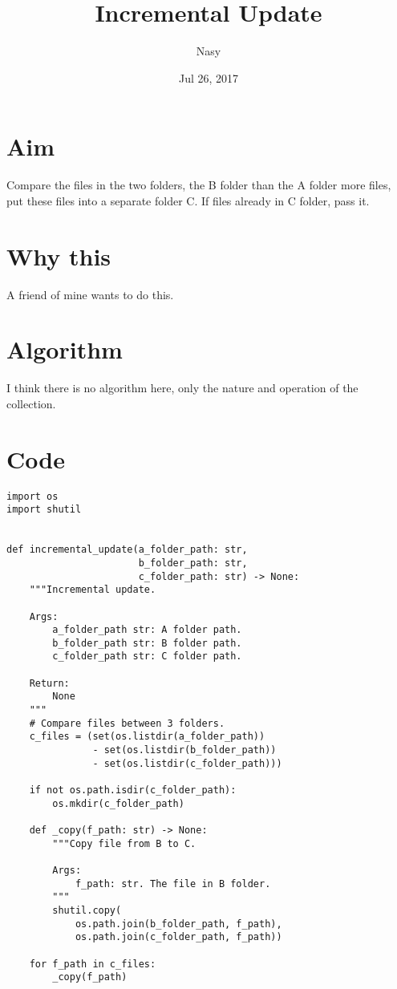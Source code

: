 \documentclass[11pt]{article}
\author{Nasy}
\date{Jul 26, 2017}
\title{\textbf{Incremental Update}}
\begin{document}
\maketitle

\section*{Aim}
\label{sec-1}
Compare the files in the two folders, the B folder than the A folder more files, put these files into a separate folder C. If files already in C folder, pass it.

\section*{Why this}
\label{sec-2}
A friend of mine wants to do this.

\section*{Algorithm}
\label{sec-3}
I think there is no algorithm here, only the nature and operation of the collection.

\section*{Code}
\label{sec-4}

\begin{verbatim}
import os
import shutil


def incremental_update(a_folder_path: str,
                       b_folder_path: str,
                       c_folder_path: str) -> None:
    """Incremental update.

    Args:
        a_folder_path str: A folder path.
        b_folder_path str: B folder path.
        c_folder_path str: C folder path.

    Return:
        None
    """
    # Compare files between 3 folders.
    c_files = (set(os.listdir(a_folder_path))
               - set(os.listdir(b_folder_path))
               - set(os.listdir(c_folder_path)))

    if not os.path.isdir(c_folder_path):
        os.mkdir(c_folder_path)

    def _copy(f_path: str) -> None:
        """Copy file from B to C.

        Args:
            f_path: str. The file in B folder.
        """
        shutil.copy(
            os.path.join(b_folder_path, f_path),
            os.path.join(c_folder_path, f_path))

    for f_path in c_files:
        _copy(f_path)
\end{verbatim}
\end{document}
